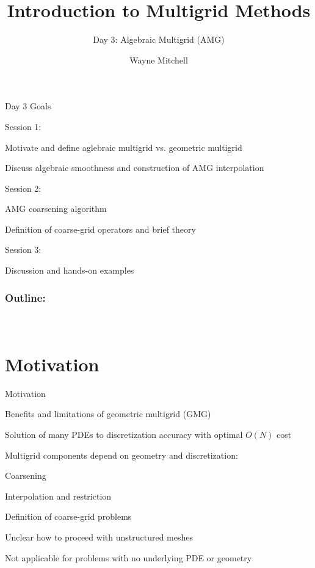\documentclass[18pt,xcolor=table]{beamer}
\title[Multigrid]{Introduction to Multigrid Methods}
\subtitle{Day 3: Algebraic Multigrid (AMG)}
\author[Mitchell]{Wayne Mitchell}
\institute{\pgfuseimage{logo}\\Universit\"at Heidelberg\\Institut f\"ur Technische Informatik}
\date[]{\alert{}}
\begin{document}


\DeclareRobustCommand{\Chi}{\raisebox{2pt}{$\chi$}}

\begin{frame}{}
\begin{block}{Day 3 Goals}
\bit
\item Session 1:
\bit
\item Motivate and define aglebraic multigrid vs. geometric multigrid
\item Discuss algebraic smoothness and construction of AMG interpolation
\eit
\item Session 2:
\bit
\item AMG coarsening algorithm
\item Definition of coarse-grid operators and brief theory
\eit
\item Session 3:
\bit
\item Discussion and hands-on examples
\eit
\eit
\end{block}
\end{frame}

\begin{frame}
\frametitle{\bf Outline:}
\framesubtitle{~~}
\tableofcontents
\end{frame}


\section{Motivation}

\begin{frame}{Motivation}
\begin{block}{Benefits and limitations of geometric multigrid (GMG)}
\bit
\item Solution of many PDEs to discretization accuracy with optimal $O(N)$ cost
\item Multigrid components depend on geometry and discretization:
\bit
\item Coarsening
\item Interpolation and restriction
\item Definition of coarse-grid problems
\eit
\item Unclear how to proceed with unstructured meshes
\item Not applicable for problems with no underlying PDE or geometry
\eit
\end{block}
\end{frame}
\end{document}
